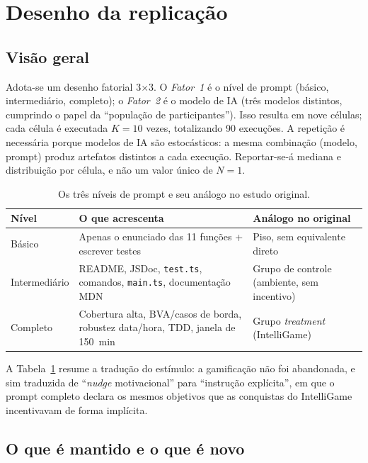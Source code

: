 \documentclass[12pt]{article}
\begin{document}
\section{Desenho da replicação}

\subsection{Visão geral}

Adota-se um desenho fatorial 3$\times$3. O \emph{Fator~1} é o nível de prompt
(básico, intermediário, completo); o \emph{Fator~2} é o modelo de IA (três
modelos distintos, cumprindo o papel da ``população de participantes''). Isso
resulta em nove células; cada célula é executada $K=10$ vezes, totalizando 90
execuções. A repetição é necessária porque modelos de IA são estocásticos: a
mesma combinação (modelo, prompt) produz artefatos distintos a cada execução.
Reportar-se-á mediana e distribuição por célula, e não um valor único de
$N=1$.

\begin{table}[ht]
\centering
\caption{Os três níveis de prompt e seu análogo no estudo original.}
\label{tab:prompts}
\begin{tabular}{p{2.3cm} p{5.1cm} p{4.5cm}}
\hline
\textbf{Nível} & \textbf{O que acrescenta} & \textbf{Análogo no original} \\
\hline
Básico & Apenas o enunciado das 11 funções + escrever testes & Piso, sem equivalente direto \\
Intermediário & README, JSDoc, \texttt{test.ts}, comandos, \texttt{main.ts}, documentação MDN & Grupo de controle (ambiente, sem incentivo) \\
Completo & Cobertura alta, BVA/casos de borda, robustez data/hora, TDD, janela de 150~min & Grupo \emph{treatment} (IntelliGame) \\
\hline
\end{tabular}
\end{table}

A Tabela~\ref{tab:prompts} resume a tradução do estímulo: a gamificação não foi
abandonada, e sim traduzida de ``\emph{nudge} motivacional'' para ``instrução
explícita'', em que o prompt completo declara os mesmos objetivos que as
conquistas do IntelliGame incentivavam de forma implícita.

\subsection{O que é mantido e o que é novo}
\end{document}
